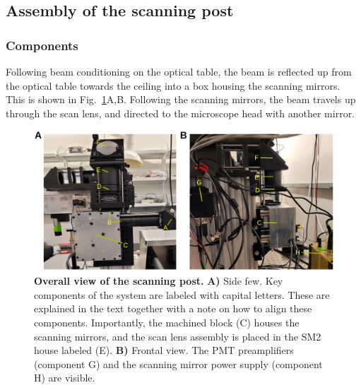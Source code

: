 \documentclass[10pt,letterpaper]{article}
\begin{document}
\subsection{Assembly of the scanning post}

\subsubsection{Components}

Following beam conditioning on the optical table, the beam is reflected up from the optical table towards the ceiling into a box housing the scanning mirrors. This is shown in Fig.~\ref{sfig4}A,B. Following the scanning mirrors, the beam travels up through the scan lens, and directed to the microscope head with another mirror.
%
\begin{figure}[h]
    \includegraphics[width=\textwidth]{sfig4.jpg}
    \caption{{\bf Overall view of the scanning post.} \textbf{A)} Side few. Key components of the system are labeled with capital letters. These are explained in the text together with a note on how to align these components. Importantly, the machined block (C) houses the scanning mirrors, and the scan lens assembly is placed in the SM2 house labeled (E). \textbf{B)} Frontal view. The PMT preamplifiers (component G) and the scanning mirror power supply (component H) are visible.}
    \label{sfig4}
\end{figure}
%
%
\end{document}
